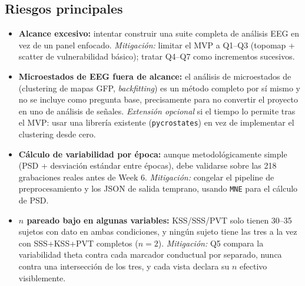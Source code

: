 \documentclass[10pt]{article}
\begin{document}
\subsection*{Riesgos principales}
\begin{itemize}
    \item \textbf{Alcance excesivo:} intentar construir una suite completa de análisis EEG en vez de un panel enfocado. \emph{Mitigación:} limitar el MVP a Q1--Q3 (topomap + scatter de vulnerabilidad básico); tratar Q4--Q7 como incrementos sucesivos.
    \item \textbf{Microestados de EEG fuera de alcance:} el análisis de microestados de \citet{bai2025} (clustering de mapas GFP, \emph{backfitting}) es un método completo por sí mismo y no se incluye como pregunta base, precisamente para no convertir el proyecto en uno de análisis de señales. \emph{Extensión opcional} si el tiempo lo permite tras el MVP: usar una librería existente (\texttt{pycrostates}) en vez de implementar el clustering desde cero.
    \item \textbf{Cálculo de variabilidad por época:} aunque metodológicamente simple (PSD + desviación estándar entre épocas), debe validarse sobre las 218 grabaciones reales antes de Week 6. \emph{Mitigación:} congelar el pipeline de preprocesamiento y los JSON de salida temprano, usando \texttt{MNE} para el cálculo de PSD.
    \item \textbf{$n$ pareado bajo en algunas variables:} KSS/SSS/PVT solo tienen 30--35 sujetos con dato en ambas condiciones, y ningún sujeto tiene las tres a la vez con SSS+KSS+PVT completos ($n=2$). \emph{Mitigación:} Q5 compara la variabilidad theta contra cada marcador conductual por separado, nunca contra una intersección de los tres, y cada vista declara su $n$ efectivo visiblemente.
\end{itemize}
\end{document}
